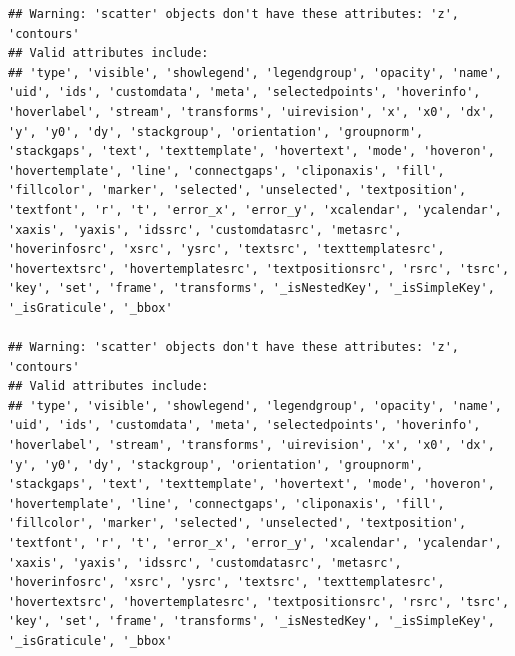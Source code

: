 \documentclass[
]{article}
\begin{document}
\begin{verbatim}
## Warning: 'scatter' objects don't have these attributes: 'z', 'contours'
## Valid attributes include:
## 'type', 'visible', 'showlegend', 'legendgroup', 'opacity', 'name', 'uid', 'ids', 'customdata', 'meta', 'selectedpoints', 'hoverinfo', 'hoverlabel', 'stream', 'transforms', 'uirevision', 'x', 'x0', 'dx', 'y', 'y0', 'dy', 'stackgroup', 'orientation', 'groupnorm', 'stackgaps', 'text', 'texttemplate', 'hovertext', 'mode', 'hoveron', 'hovertemplate', 'line', 'connectgaps', 'cliponaxis', 'fill', 'fillcolor', 'marker', 'selected', 'unselected', 'textposition', 'textfont', 'r', 't', 'error_x', 'error_y', 'xcalendar', 'ycalendar', 'xaxis', 'yaxis', 'idssrc', 'customdatasrc', 'metasrc', 'hoverinfosrc', 'xsrc', 'ysrc', 'textsrc', 'texttemplatesrc', 'hovertextsrc', 'hovertemplatesrc', 'textpositionsrc', 'rsrc', 'tsrc', 'key', 'set', 'frame', 'transforms', '_isNestedKey', '_isSimpleKey', '_isGraticule', '_bbox'

## Warning: 'scatter' objects don't have these attributes: 'z', 'contours'
## Valid attributes include:
## 'type', 'visible', 'showlegend', 'legendgroup', 'opacity', 'name', 'uid', 'ids', 'customdata', 'meta', 'selectedpoints', 'hoverinfo', 'hoverlabel', 'stream', 'transforms', 'uirevision', 'x', 'x0', 'dx', 'y', 'y0', 'dy', 'stackgroup', 'orientation', 'groupnorm', 'stackgaps', 'text', 'texttemplate', 'hovertext', 'mode', 'hoveron', 'hovertemplate', 'line', 'connectgaps', 'cliponaxis', 'fill', 'fillcolor', 'marker', 'selected', 'unselected', 'textposition', 'textfont', 'r', 't', 'error_x', 'error_y', 'xcalendar', 'ycalendar', 'xaxis', 'yaxis', 'idssrc', 'customdatasrc', 'metasrc', 'hoverinfosrc', 'xsrc', 'ysrc', 'textsrc', 'texttemplatesrc', 'hovertextsrc', 'hovertemplatesrc', 'textpositionsrc', 'rsrc', 'tsrc', 'key', 'set', 'frame', 'transforms', '_isNestedKey', '_isSimpleKey', '_isGraticule', '_bbox'
\end{verbatim}

\hypertarget{htmlwidget-ef67bc1b8bf9c35a09e2}{}
\begin{plotly}

\end{plotly}

\hypertarget{htmlwidget-3513292d17576ce039e9}{}
\begin{plotly}

\end{plotly}

\hypertarget{htmlwidget-c5cad7749f6c5184301e}{}
\begin{plotly}

\end{plotly}
\end{document}
